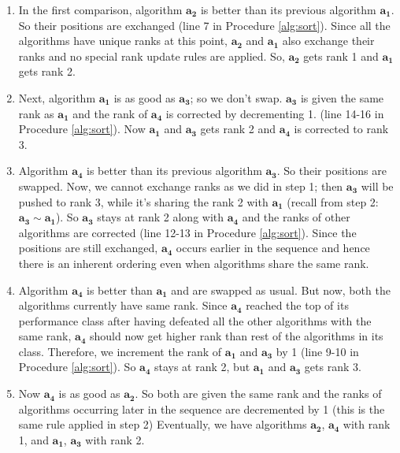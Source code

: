 \documentclass[conference]{IEEEtran}
\begin{document}
\begin{enumerate}
	\item 
	In the first comparison, algorithm $\mathbf{a_2}$ is better than its previous algorithm $\mathbf{a_1}$. So their positions are exchanged (line 7 in Procedure \ref{alg:sort}). Since all the algorithms have unique ranks at this point, $\mathbf{a_2}$ and $\mathbf{a_1}$ also exchange their ranks and no special rank update rules are applied. So, $\mathbf{a_2}$ gets rank 1 and $\mathbf{a_1}$ gets rank 2.
	
	\item Next, algorithm $\mathbf{a_1}$ is as good as $\mathbf{a_3}$; so we don't swap.
	 $\mathbf{a_3}$ is given the same rank as $\mathbf{a_1}$ and the rank of $\mathbf{a_4}$ is corrected by decrementing 1. (line 14-16 in Procedure \ref{alg:sort}). Now $\mathbf{a_1}$ and $\mathbf{a_3}$ gets rank 2 and $\mathbf{a_4}$ is corrected to rank 3.
	
	\item Algorithm $\mathbf{a_4}$ is better than its previous algorithm $\mathbf{a_3}$. So their positions are swapped. Now, we cannot exchange ranks as we did in step 1; then $\mathbf{a_3}$ will be pushed to rank 3, while it's sharing the rank 2 with $\mathbf{a_1}$ (recall from step 2: $\mathbf{a_3} \sim \mathbf{a_1}$). So $\mathbf{a_3}$ stays at rank 2 along with $\mathbf{a_4}$ and the ranks of other algorithms are corrected  (line 12-13 in Procedure \ref{alg:sort}). Since the positions are still exchanged,  $\mathbf{a_4}$ occurs earlier in the sequence and hence there is an inherent ordering even when algorithms share the same rank. 
	
	
	\item Algorithm $\mathbf{a_4}$ is better than $\mathbf{a_1}$ and are swapped as usual. But now, both the algorithms currently have same rank. Since $\mathbf{a_4}$ reached  the top of its performance class  after having defeated all the other algorithms with the same rank, $\mathbf{a_4}$ should now get higher rank than rest of the algorithms in its class. Therefore, we increment the rank of $\mathbf{a_1}$ and $\mathbf{a_3}$ by 1 (line 9-10 in Procedure \ref{alg:sort}). So $\mathbf{a_4}$ stays at rank 2, but $\mathbf{a_1}$ and $\mathbf{a_3}$ gets rank 3.
	
	\item Now $\mathbf{a_4}$ is as good as $\mathbf{a_2}$. So both are given the same rank and the ranks of algorithms occurring later in the sequence are decremented by 1 (this is the same rule applied in step 2) Eventually, we have algorithms $\mathbf{a_2}$, $\mathbf{a_4}$ with rank 1, and $\mathbf{a_1}$,  $\mathbf{a_3}$ with rank 2.
\end{enumerate}
\end{document}
